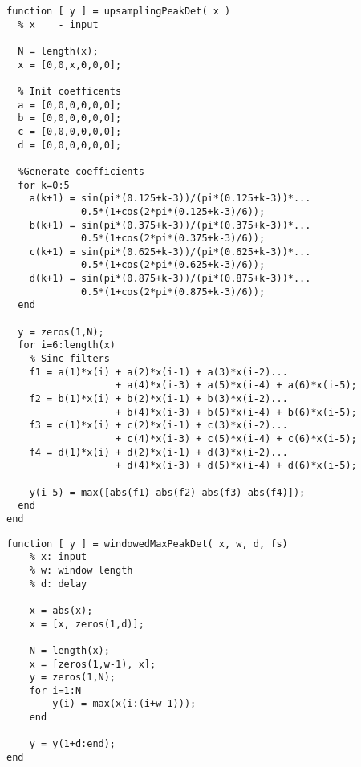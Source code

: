 \documentclass[../main2.tex]{subfiles}
\begin{document}

\begin{lstlisting}[style=customc]
function [ y ] = upsamplingPeakDet( x )
  % x    - input

  N = length(x);
  x = [0,0,x,0,0,0];
    
  % Init coefficents
  a = [0,0,0,0,0,0];
  b = [0,0,0,0,0,0];
  c = [0,0,0,0,0,0];
  d = [0,0,0,0,0,0];
    
  %Generate coefficients
  for k=0:5
    a(k+1) = sin(pi*(0.125+k-3))/(pi*(0.125+k-3))*...
             0.5*(1+cos(2*pi*(0.125+k-3)/6));
    b(k+1) = sin(pi*(0.375+k-3))/(pi*(0.375+k-3))*...
             0.5*(1+cos(2*pi*(0.375+k-3)/6));
    c(k+1) = sin(pi*(0.625+k-3))/(pi*(0.625+k-3))*...
             0.5*(1+cos(2*pi*(0.625+k-3)/6));
    d(k+1) = sin(pi*(0.875+k-3))/(pi*(0.875+k-3))*...
             0.5*(1+cos(2*pi*(0.875+k-3)/6));
  end
    
  y = zeros(1,N);
  for i=6:length(x) 
    % Sinc filters
    f1 = a(1)*x(i) + a(2)*x(i-1) + a(3)*x(i-2)...
                   + a(4)*x(i-3) + a(5)*x(i-4) + a(6)*x(i-5);
    f2 = b(1)*x(i) + b(2)*x(i-1) + b(3)*x(i-2)...
                   + b(4)*x(i-3) + b(5)*x(i-4) + b(6)*x(i-5);
    f3 = c(1)*x(i) + c(2)*x(i-1) + c(3)*x(i-2)...
                   + c(4)*x(i-3) + c(5)*x(i-4) + c(6)*x(i-5);
    f4 = d(1)*x(i) + d(2)*x(i-1) + d(3)*x(i-2)...
                   + d(4)*x(i-3) + d(5)*x(i-4) + d(6)*x(i-5);
                  
    y(i-5) = max([abs(f1) abs(f2) abs(f3) abs(f4)]);
  end
end
\end{lstlisting}
\begin{lstlisting}[style=customc]
function [ y ] = windowedMaxPeakDet( x, w, d, fs)
    % x: input
    % w: window length
    % d: delay
    
    x = abs(x);
    x = [x, zeros(1,d)];
    
    N = length(x);
    x = [zeros(1,w-1), x];
    y = zeros(1,N);
    for i=1:N
        y(i) = max(x(i:(i+w-1)));
    end
    
    y = y(1+d:end);
end
\end{lstlisting}
\clearpage
\end{document}
